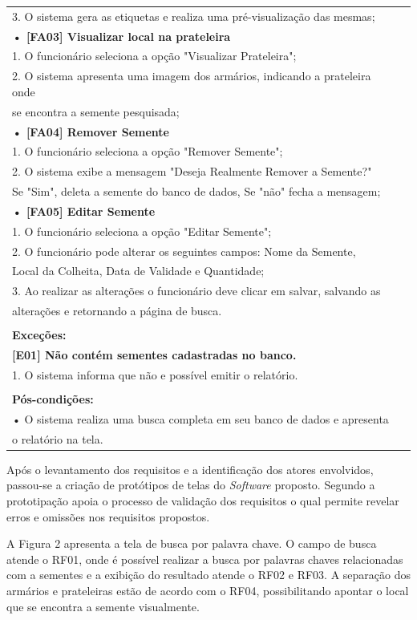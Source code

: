 \documentclass[12pt,a4paper]{article}
\begin{document}
\begin{table}[]
\begin{tabular}{|l|c|}
	3. O sistema gera as etiquetas e realiza uma pré-visualização das mesmas;\\
{\bf • [FA03] Visualizar local na prateleira}\\
1. O funcionário seleciona a opção "Visualizar Prateleira";\\
2. O sistema apresenta uma imagem dos armários, indicando a prateleira onde \\ se encontra a semente pesquisada;\\ 
{\bf • [FA04] Remover Semente}\\
1. O funcionário seleciona a opção "Remover Semente";\\
2. O sistema exibe a mensagem "Deseja Realmente Remover a Semente?"\\
Se "Sim", deleta a semente do banco de dados, Se "não" fecha a mensagem; \\ 
{\bf • [FA05] Editar Semente}\\
1. O funcionário seleciona a opção "Editar Semente";\\
2. O funcionário pode alterar os seguintes campos: Nome da Semente,\\
Local da Colheita, Data de Validade e Quantidade;\\
3. Ao realizar as alterações o funcionário deve clicar em salvar, salvando as\\
alterações e retornando a página de busca.
\\\\
{\bf Exceções:}\\
 {\bf [E01] Não contém sementes cadastradas no banco.}\\
1. O sistema informa que não e possível emitir o relatório.
\\\\
{\bf Pós-condições:}\\
• O sistema realiza uma busca completa em seu banco de dados e apresenta\\ o relatório na tela.\\
\hline 
\end{tabular} 
\end{table} 

Após o levantamento dos requisitos e a identificação dos atores envolvidos, passou-se a criação de protótipos de telas do {\it Software} proposto. Segundo \cite{sommerville} a prototipação apoia o processo de validação dos requisitos o qual permite revelar erros e omissões nos requisitos propostos.

A Figura 2 apresenta a tela de busca por palavra chave. O campo de busca atende o RF01, onde é possível realizar a busca por palavras chaves relacionadas com a sementes e a exibição do resultado atende o RF02 e RF03. A separação dos armários e prateleiras estão de acordo com o RF04, possibilitando apontar o local que se encontra a semente visualmente.
\end{document}
